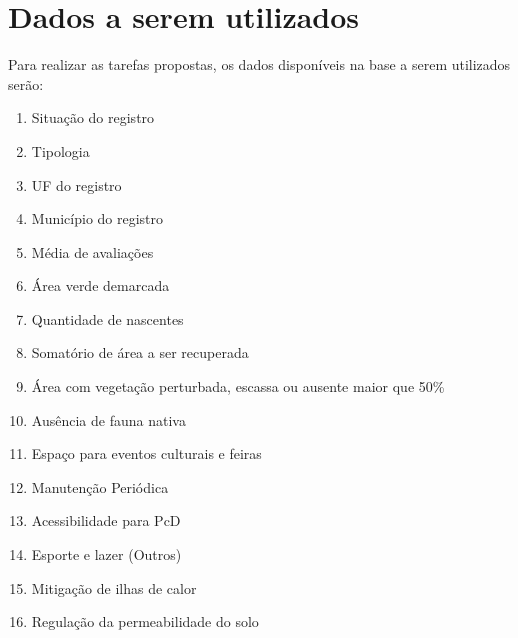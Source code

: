 \documentclass[12pt]{article}
\begin{document}
\section{Dados a serem utilizados}
    Para realizar as tarefas propostas, os dados disponíveis na base a serem utilizados serão:
    \begin{enumerate}
        \item Situação do registro
        \item Tipologia
        \item UF do registro
        \item Município do registro
        \item Média de avaliações
        \item Área verde demarcada
        \item Quantidade de nascentes
        \item Somatório de área a ser recuperada
        \item Área com vegetação perturbada, escassa ou ausente maior que 50\%
        \item Ausência de fauna nativa
        \item Espaço para eventos culturais e feiras
        \item Manutenção Periódica
        \item Acessibilidade para PcD
        \item Esporte e lazer (Outros)
        \item Mitigação de ilhas de calor
        \item Regulação da permeabilidade do solo
    \end{enumerate}

    
\clearpage

%
\end{document}
